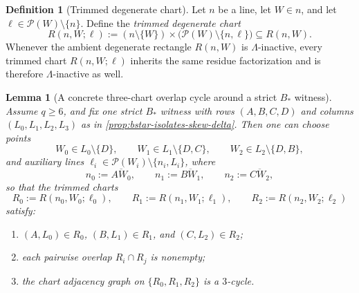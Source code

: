 \documentclass[11pt]{amsart}
\numberwithin{equation}{section}
\theoremstyle{plain}
\newtheorem{lemma}[theorem]{Lemma}
\theoremstyle{definition}
\newtheorem{definition}[theorem]{Definition}
\theoremstyle{remark}
\newcommand{\Lam}{\Lambda}
\begin{document}
\begin{definition}[Trimmed degenerate chart]
\label{def:trimmed-degenerate-chart}
Let $n$ be a line, let $W\in n$, and let $\ell\in \mathcal P(W)\setminus\{n\}$. Define the \emph{trimmed degenerate chart}
\[
R(n,W;\ell):=(n\setminus\{W\})\times\bigl(\mathcal P(W)\setminus\{n,\ell\}\bigr)\subseteq R(n,W).
\]
Whenever the ambient degenerate rectangle $R(n,W)$ is $\Lam$-inactive, every trimmed chart $R(n,W;\ell)$ inherits the same residue
factorization and is therefore $\Lam$-inactive as well.
\end{definition}

\begin{lemma}[A concrete three-chart overlap cycle around a strict $B_*$ witness]
\label{lem:three-chart-cycle-bstar}
Assume $q\ge 6$, and fix one strict $B_*$ witness with rows $(A,B,C,D)$ and columns $(L_0,L_1,L_2,L_3)$ as in
\cref{prop:bstar-isolates-skew-delta}. Then one can choose points
\[
W_0\in L_0\setminus\{D\},\qquad W_1\in L_1\setminus\{D,C\},\qquad W_2\in L_2\setminus\{D,B\},
\]
and auxiliary lines $\ell_i\in \mathcal P(W_i)\setminus\{n_i,L_i\}$, where
\[
n_0:=\overline{AW_0},\qquad n_1:=\overline{BW_1},\qquad n_2:=\overline{CW_2},
\]
so that the trimmed charts
\[
R_0:=R(n_0,W_0;\ell_0),\qquad R_1:=R(n_1,W_1;\ell_1),\qquad R_2:=R(n_2,W_2;\ell_2)
\]
satisfy:
\begin{enumerate}[leftmargin=2em]
  \item $(A,L_0)\in R_0$, $(B,L_1)\in R_1$, and $(C,L_2)\in R_2$;
  \item each pairwise overlap $R_i\cap R_j$ is nonempty;
  \item the chart adjacency graph on $\{R_0,R_1,R_2\}$ is a $3$-cycle.
\end{enumerate}
\end{lemma}
\end{document}
